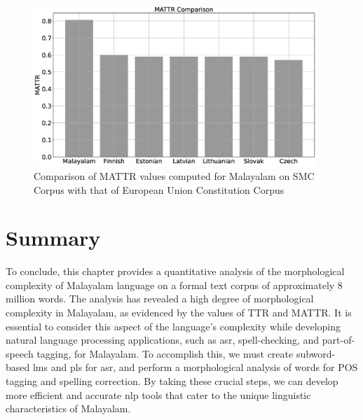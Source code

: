 \begin{figure}[ht]
	\begin{center}

		\includegraphics[width=0.95\textwidth]{tsd1030e.eps}
		\caption{Comparison of MATTR values computed for Malayalam on SMC Corpus with that of European Union Constitution Corpus}
		\label{fig:MATTRcomp}
	\end{center}
\end{figure}

\section{Summary}

To conclude, this chapter provides a quantitative analysis of the morphological complexity of Malayalam language on a formal text corpus of approximately 8 million words. The analysis has revealed a high degree of morphological complexity in Malayalam, as evidenced by the values of TTR and MATTR. It is essential to consider this aspect of the language's complexity while developing natural language processing applications, such as \gls{asr}, spell-checking, and part-of-speech tagging, for Malayalam. To accomplish this, we must create subword-based \gls{lm}s and \gls{pl}s for \gls{asr}, and perform a morphological analysis of words for POS tagging and spelling correction. By taking these crucial steps, we can develop more efficient and accurate \gls{nlp} tools that cater to the unique linguistic characteristics of Malayalam.